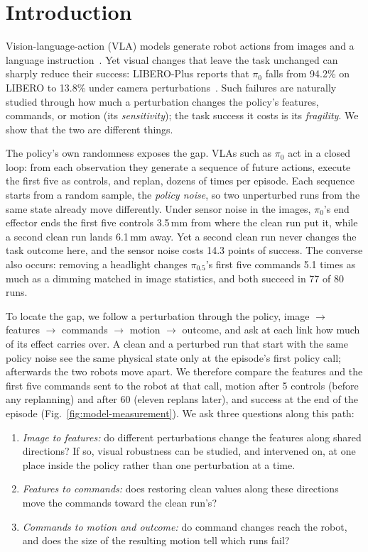 \section{Introduction}

Vision-language-action (VLA) models generate robot actions from images and a language instruction~\cite{brohan2023rt2,kim2024openvla,pi0,pi05}. Yet visual changes that leave the task unchanged can sharply reduce their success: LIBERO-Plus reports that $\pi_0$ falls from 94.2\% on LIBERO to 13.8\% under camera perturbations~\cite{fei2026liberoplus}. Such failures are naturally studied through how much a perturbation changes the policy's features, commands, or motion (its \emph{sensitivity}); the task success it costs is its \emph{fragility}. We show that the two are different things.

The policy's own randomness exposes the gap. VLAs such as $\pi_0$ act in a closed loop: from each observation they generate a sequence of future actions, execute the first five as controls, and replan, dozens of times per episode. Each sequence starts from a random sample, the \emph{policy noise}, so two unperturbed runs from the same state already move differently. Under sensor noise in the images, $\pi_0$'s end effector ends the first five controls 3.5\,mm from where the clean run put it, while a second clean run lands 6.1\,mm away. Yet a second clean run never changes the task outcome here, and the sensor noise costs 14.3 points of success. The converse also occurs: removing a headlight changes $\pi_{0.5}$'s first five commands 5.1 times as much as a dimming matched in image statistics, and both succeed in 77 of 80 runs.

To locate the gap, we follow a perturbation through the policy, image $\to$ features $\to$ commands $\to$ motion $\to$ outcome, and ask at each link how much of its effect carries over. A clean and a perturbed run that start with the same policy noise see the same physical state only at the episode's first policy call; afterwards the two robots move apart. We therefore compare the features and the first five commands sent to the robot at that call, motion after 5 controls (before any replanning) and after 60 (eleven replans later), and success at the end of the episode (Fig.~\ref{fig:model-measurement}). We ask three questions along this path:
\begin{enumerate}
\item \emph{Image to features:} do different perturbations change the features along shared directions? If so, visual robustness can be studied, and intervened on, at one place inside the policy rather than one perturbation at a time.
\item \emph{Features to commands:} does restoring clean values along these directions move the commands toward the clean run's?
\item \emph{Commands to motion and outcome:} do command changes reach the robot, and does the size of the resulting motion tell which runs fail?
\end{enumerate}

